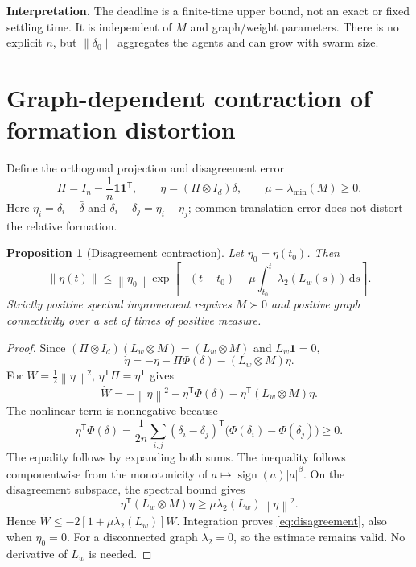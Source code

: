 \documentclass[11pt,a4paper]{article}
\newtheorem{proposition}{Proposition}
\theoremstyle{remark}
\newcommand{\one}{\mathbf 1}
\newcommand{\norm}[1]{\left\lVert#1\right\rVert}
\newcommand{\dd}{\mathrm d}
\newcommand{\transpose}{^{\mathsf T}}
\begin{document}
\textbf{Interpretation.}
The deadline is a finite-time upper bound, not an exact or fixed settling time. It is independent of $M$ and graph/weight parameters. There is no explicit $n$, but $\norm{\delta_0}$ aggregates the agents and can grow with swarm size.

\section{Graph-dependent contraction of formation distortion}

Define the orthogonal projection and disagreement error
\begin{equation}
\Pi=I_n-\frac1n\one\one\transpose,
\qquad \eta=(\Pi \otimes I_d)\delta,
\qquad \mu=\lambda_{\min}(M)\ge0.
\label{eq:eta}
\end{equation}
Here $\eta_i=\delta_i-\bar\delta$ and $\delta_i-\delta_j=\eta_i-\eta_j$; common translation error does not distort the relative formation.

\begin{proposition}[Disagreement contraction]
Let $\eta_0=\eta(t_0)$. Then
\begin{equation}
\boxed{\quad
\norm{\eta(t)}\le\norm{\eta_0}
\exp\!\left[-(t-t_0)-\mu\int_{t_0}^{t}\lambda_2(L_w(s))\,\dd s\right].
\quad}
\label{eq:disagreement}
\end{equation}
Strictly positive spectral improvement requires $M\succ0$ and positive graph connectivity over a set of times of positive measure.
\end{proposition}
\begin{proof}
Since $(\Pi \otimes I_d) (L_w\otimes M)=(L_w\otimes M)$ and $L_w\one=0$,
\[
\dot\eta=-\eta-\Pi\Phi(\delta)-(L_w\otimes M)\eta.
\]
For $W=\tfrac12\norm{\eta}^2$, $\eta\transpose\Pi=\eta\transpose$ gives
\begin{equation}
\dot W=-\norm{\eta}^2-\eta\transpose\Phi(\delta)
-\eta\transpose(L_w\otimes M)\eta.
\label{eq:Wdot}
\end{equation}
The nonlinear term is nonnegative because
\begin{equation}
\eta\transpose\Phi(\delta)=\frac1{2n}\sum_{i,j}
(\delta_i-\delta_j)\transpose\bigl(\Phi(\delta_i)-\Phi(\delta_j)\bigr)\ge0.
\label{eq:monotonicity}
\end{equation}
The equality follows by expanding both sums. The inequality follows componentwise from the monotonicity of $a\mapsto\operatorname{sign}(a)|a|^\beta$.
On the disagreement subspace, the spectral bound gives
\[
\eta\transpose(L_w\otimes M)\eta
\ge\mu\lambda_2(L_w)\norm{\eta}^2.
\]
Hence $\dot W\le-2[1+\mu\lambda_2(L_w)]W$. Integration proves \eqref{eq:disagreement}, also when $\eta_0=0$. For a disconnected graph $\lambda_2=0$, so the estimate remains valid. No derivative of $L_w$ is needed.
\end{proof}
\end{document}
